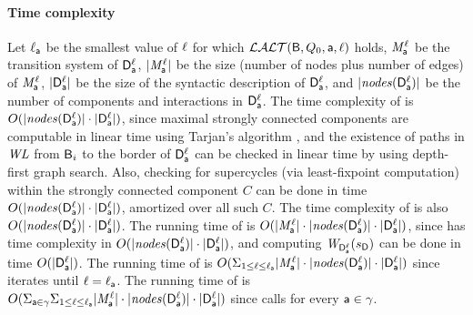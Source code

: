 \paragraph{Time complexity} 
Let 
$\ell_{\mathsf{a}}$ be the smallest value of $\ell$ for which  $\mathcal{LALT}(\mathsf{B}, Q_0, \mathsf{a}, \ell)$ holds, 
$\mathit{M}_{\mathsf{a}}^{\ell}$ be the transition system of $\mathsf{D}_{\mathsf{a}}^{\ell}$, 
$|\mathit{M}_{\mathsf{a}}^{\ell}|$ be the size (number of nodes plus number of edges) of $\mathit{M}_{\mathsf{a}}^{\ell}$, 
$|\mathsf{D}_{\mathsf{a}}^{\ell}|$ be the size of the syntactic description of $\mathsf{D}_{\mathsf{a}}^{\ell}$, and 
$|\mathit{nodes}(\mathsf{D}_{\mathsf{a}}^{\ell})|$ be the number of components and interactions in $\mathsf{D}_{\mathsf{a}}^{\ell}$.
%
The time complexity of  is $O(|\mathit{nodes}(\mathsf{D}_{\mathsf{a}}^{\ell})| \cdot |\mathsf{D}_{\mathsf{a}}^{\ell}|)$, since maximal strongly connected components
are computable in linear time using Tarjan's algorithm \cite{Ta72}, and the existence of paths in $\mathit{WL}$ from $\mathsf{B}_i$ to the border of $\mathsf{D}_{\mathsf{a}}^{\ell}$ can be checked in linear time by 
using depth-first graph search. Also, checking for supercycles (via least-fixpoint computation) within the strongly connected component $C$ can be done in time 
$O(|\mathit{nodes}(\mathsf{D}_{\mathsf{a}}^{\ell})| \cdot |\mathsf{D}_{\mathsf{a}}^{\ell}|)$, amortized over all such $C$.
%
The time complexity of  is also $O(|\mathit{nodes}(\mathsf{D}_{\mathsf{a}}^{\ell})| \cdot |\mathsf{D}_{\mathsf{a}}^{\ell}|)$.
%
The running time of  is $O(|\mathit{M}_{\mathsf{a}}^{\ell}| \cdot |\mathit{nodes}(\mathsf{D}_{\mathsf{a}}^{\ell})| \cdot |\mathsf{D}_{\mathsf{a}}^{\ell}|)$,
since \cLFP{$\dsks{\act}{\l}, \sD$} has time complexity in $O(|\mathit{nodes}(\mathsf{D}_{\mathsf{a}}^{\ell})| \cdot |\mathsf{D}_{\mathsf{a}}^{\ell}|)$, and computing 
$\mathit{W}_{\mathsf{D}_{\mathsf{a}}^{\ell}}({s_\mathsf{D}})$ can be done in time $O(|\mathsf{D}_{\mathsf{a}}^{\ell}|)$.
%
The running time of  is $O(\Sigma_{1 \le \ell \le \ell_{\mathsf{a}}} |\mathit{M}_{\mathsf{a}}^{\ell}| \cdot |\mathit{nodes}(\mathsf{D}_{\mathsf{a}}^{\ell})| \cdot |\mathsf{D}_{\mathsf{a}}^{\ell}|)$
since  iterates  until $\ell = \ell_{\mathsf{a}}$.
%
The running  time of  is
$O(\Sigma_{\mathsf{a} \in \gamma}  \Sigma_{1 \le \ell \le \ell_{\mathsf{a}}} |\mathit{M}_{\mathsf{a}}^{\ell}| \cdot |\mathit{nodes}(\mathsf{D}_{\mathsf{a}}^{\ell})| \cdot |\mathsf{D}_{\mathsf{a}}^{\ell}|)$
since  calls  for every $\mathsf{a} \in \gamma$.







